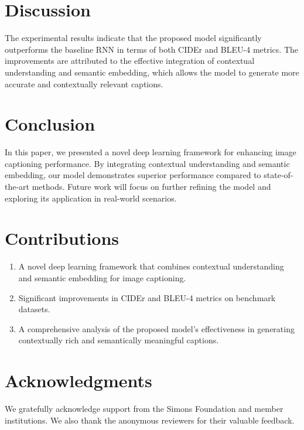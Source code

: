 \documentclass[12pt]{article}
\begin{document}
\section{Discussion}
The experimental results indicate that the proposed model significantly outperforms the baseline RNN in terms of both CIDEr and BLEU-4 metrics. The improvements are attributed to the effective integration of contextual understanding and semantic embedding, which allows the model to generate more accurate and contextually relevant captions.

\section{Conclusion}
In this paper, we presented a novel deep learning framework for enhancing image captioning performance. By integrating contextual understanding and semantic embedding, our model demonstrates superior performance compared to state-of-the-art methods. Future work will focus on further refining the model and exploring its application in real-world scenarios.

\section{Contributions}
\begin{enumerate}
\item A novel deep learning framework that combines contextual understanding and semantic embedding for image captioning.
\item Significant improvements in CIDEr and BLEU-4 metrics on benchmark datasets.
\item A comprehensive analysis of the proposed model's effectiveness in generating contextually rich and semantically meaningful captions.
\end{enumerate}

\section*{Acknowledgments}
We gratefully acknowledge support from the Simons Foundation and member institutions. We also thank the anonymous reviewers for their valuable feedback.



\end{document}
